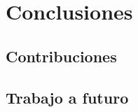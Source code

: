 \chapter{Conclusiones}
\label{chap:conclusions}



\section{Contribuciones}
\label{sec:contributions}



\section{Trabajo a futuro}
\label{sec:futurework}


